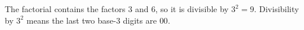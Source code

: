 The factorial contains the factors $3$ and $6$, so it is divisible by $3^2=9$. Divisibility by $3^2$ means the last two base-$3$ digits are $\boxed{00}$.

